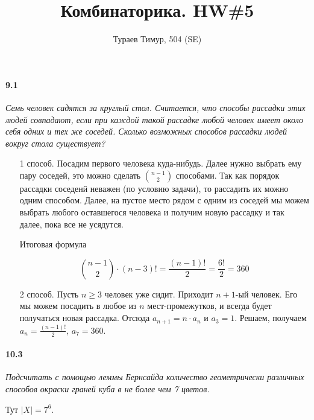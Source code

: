 \documentclass[russian]{article}
\begin{document}
\title{Комбинаторика. HW\#5}
\author{Тураев Тимур, 504 (SE)}
\maketitle

\paragraph*{9.1}

\textit{Семь человек садятся за круглый стол. Считается, что способы рассадки этих людей совпадают, если при каждой такой рассадке любой человек имеет около себя одних и тех же соседей. Сколько возможных способов рассадки людей вокруг стола существует?}

\begin{itemize}
\item[1 способ.] Посадим первого человека куда-нибудь. Далее нужно выбрать ему пару соседей, это можно сделать $\binom{n-1}{2}$ способами. Так как порядок рассадки соседенй неважен (по условию задачи), то рассадить их можно одним способом. Далее, на пустое место рядом с одним из соседей мы можем выбрать любого оставшегося человека и получим новую рассадку и так далее, пока все не усядутся.

Итоговая формула

\[
\binom{n-1}{2} \cdot (n-3)! = \frac{(n-1)!}{2} = \frac{6!}{2} = 360
\]
\item[2 способ.] Пусть $n \geqslant 3$ человек уже сидит. Приходит $n+1$-ый человек. Его мы можем посадить в любое из $n$ мест-промежутков, и всегда будет получаться новая рассадка. Отсюда $a_{n+1} = n \cdot a_n$ и $a_3 = 1$. Решаем, получаем $a_n = \frac{(n-1)!}{2}$, $a_7 = 360$. 
\end{itemize}


\paragraph*{10.3}

\textit{Подсчитать с помощью леммы Бернсайда количество геометрически различных способов окраски граней куба в не более чем 7 цветов.}

Тут $|X| = 7^6$.
\end{document}
